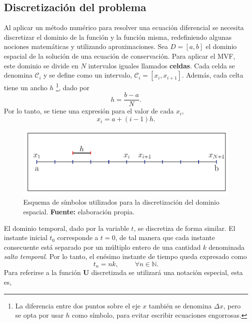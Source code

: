 \subsection{Discretización del problema}
Al aplicar un método numérico para resolver una ecuación diferencial se necesita discretizar el dominio de la función y la función misma, redefiniendo algunas nociones matemáticas y utilizando aproximaciones. Sea  $D = [a,b]$ el dominio espacial de la solución de una ecuación de conservación. Para aplicar el MVF, este dominio se divide en $N$ intervalos iguales llamados \textbf{celdas}. Cada celda se denomina $\mathcal{C}_i$ y se define como un intervalo, $\mathcal{C}_i = [x_i, x_{i+1}]$. Además, cada celta tiene un ancho $h$ \footnote{La diferencia entre dos puntos sobre el eje $x$ también se denomina $\Delta x$, pero se opta por usar $h$ como símbolo, para evitar escribir ecuaciones engorrosas.}, dado por
\begin{equation}
	h = \frac{b-a}{N}.
\end{equation}
Por lo tanto, se tiene una expresión para el valor de cada $x_i$,
\begin{equation}
	x_i = a + (i-1)h.
\end{equation} 
\begin{figure}[ht]
	\centering
	\includegraphics[width=\linewidth]{../some_plots/cap2/graficas/domain.pdf}
	\caption{Esquema de símbolos utilizados para la discretización del dominio espacial. \textbf{Fuente:} elaboración propia.}
	\label{fig:discretizacion-eje-x}
\end{figure}
El dominio temporal, dado por la variable $t$, se discretiza de forma similar. El instante inicial $t_0$ corresponde a $t=0$, de tal manera que cada instante consecuente está separado por un múltiplo entero de una cantidad $k$ denominada \textit{salto temporal}. Por lo tanto, el enésimo instante de tiempo queda expresado como
\begin{equation}
	t_n = nk, \hspace{1cm} \forall n \in \mathbb{N}.
\end{equation}
Para referirse a la función $\mathbf{U}$ discretizada se utilizará una notación especial, esta es,
